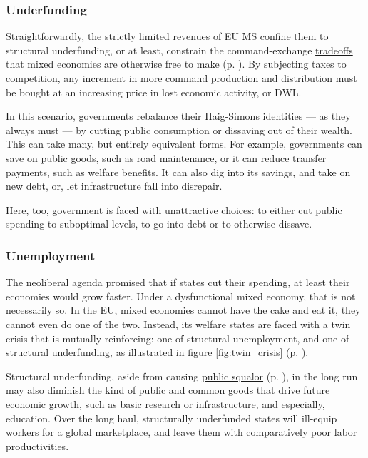 \documentclass[11pt,a4paper,oneside,openright]{article}
\begin{document}
\subsubsection{Underfunding} \label{sec:public_squalor} Straightforwardly, the strictly limited revenues of \gls{EU} \gls{MS} confine them to structural underfunding, or at least, constrain the command-exchange \hyperref[sec:tradeoffs]{tradeoffs} that mixed economies are otherwise free to make (p. \pageref{sec:tradeoffs}). %
By subjecting taxes to competition, any increment in more command production and distribution must be bought at an increasing price in lost economic activity, or \gls{DWL}. 

In this scenario, governments rebalance their Haig-Simons identities --- as they always must --- by cutting public consumption or dissaving out of their wealth. 
This can take many, but entirely equivalent forms. 
For example, governments can save on public goods, such as road maintenance, or it can reduce transfer payments, such as welfare benefits. 
It can also dig into its savings, and take on new debt, or, let infrastructure fall into disrepair.

Here, too, government is faced with unattractive choices: 
to either cut public spending to suboptimal levels, to go into debt or to otherwise dissave.


\subsubsection{Unemployment}
The neoliberal agenda promised that if states cut their spending, at least their economies would grow faster. 
Under a dysfunctional mixed economy, that is not necessarily so. 
In the \gls{EU}, mixed economies cannot have the cake and eat it, they cannot even do one of the two. 
Instead, its welfare states are faced with a twin crisis that is mutually reinforcing: 
one of structural unemployment, and one of structural underfunding, as illustrated in figure \ref{fig:twin_crisis} (p. \pageref{fig:twin_crisis}). 

Structural underfunding, aside from causing \hyperref[sec:public_squalor]{public squalor} (p. \pageref{sec:public_squalor}), in the long run may also diminish the kind of public and common goods that drive future economic growth, such as basic research or infrastructure, and especially, education. 
Over the long haul, structurally underfunded states will ill-equip workers for a global marketplace, and leave them with comparatively poor labor productivities.
\end{document}
